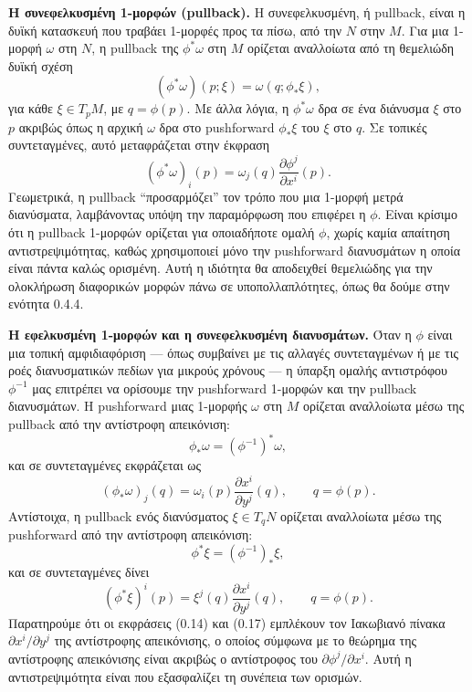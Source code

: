 \documentclass[12pt]{article}
\begin{document}
\textbf{Η συνεφελκυσμένη 1-μορφών (pullback).} Η συνεφελκυσμένη, ή pullback, είναι η δυϊκή κατασκευή που τραβάει 1-μορφές προς τα πίσω, από την $N$ στην $M$. Για μια 1-μορφή $\omega$ στη $N$, η pullback της $\phi^* \omega$ στη $M$ ορίζεται αναλλοίωτα από τη θεμελιώδη δυϊκή σχέση
\[
(\phi^* \omega)(p; \xi) = \omega(q; \phi_* \xi),
\]
για κάθε $\xi \in T_pM$, με $q = \phi(p)$. Με άλλα λόγια, η $\phi^* \omega$ δρα σε ένα διάνυσμα $\xi$ στο $p$ ακριβώς όπως η αρχική $\omega$ δρα στο pushforward $\phi_* \xi$ του $\xi$ στο $q$. Σε τοπικές συντεταγμένες, αυτό μεταφράζεται στην έκφραση
\[
(\phi^* \omega)_i(p) = \omega_j(q) \frac{\partial \phi^j}{\partial x^i}(p). \tag{0.16}
\]
Γεωμετρικά, η pullback ``προσαρμόζει'' τον τρόπο που μια 1-μορφή μετρά διανύσματα, λαμβάνοντας υπόψη την παραμόρφωση που επιφέρει η $\phi$. Είναι κρίσιμο ότι η pullback 1-μορφών ορίζεται για οποιαδήποτε ομαλή $\phi$, χωρίς καμία απαίτηση αντιστρεψιμότητας, καθώς χρησιμοποιεί μόνο την pushforward διανυσμάτων η οποία είναι πάντα καλώς ορισμένη. Αυτή η ιδιότητα θα αποδειχθεί θεμελιώδης για την ολοκλήρωση διαφορικών μορφών πάνω σε υποπολλαπλότητες, όπως θα δούμε στην ενότητα 0.4.4.

\textbf{Η εφελκυσμένη 1-μορφών και η συνεφελκυσμένη διανυσμάτων.} Όταν η $\phi$ είναι μια τοπική αμφιδιαφόριση --- όπως συμβαίνει με τις αλλαγές συντεταγμένων ή με τις ροές διανυσματικών πεδίων για μικρούς χρόνους --- η ύπαρξη ομαλής αντιστρόφου $\phi^{-1}$ μας επιτρέπει να ορίσουμε την pushforward 1-μορφών και την pullback διανυσμάτων. Η pushforward μιας 1-μορφής $\omega$ στη $M$ ορίζεται αναλλοίωτα μέσω της pullback από την αντίστροφη απεικόνιση:
\[
\phi_* \omega = (\phi^{-1})^* \omega,
\]
και σε συντεταγμένες εκφράζεται ως
\[
(\phi_* \omega)_j(q) = \omega_i(p) \frac{\partial x^i}{\partial y^j}(q), \qquad q = \phi(p). \tag{0.14}
\]
Αντίστοιχα, η pullback ενός διανύσματος $\xi \in T_qN$ ορίζεται αναλλοίωτα μέσω της pushforward από την αντίστροφη απεικόνιση:
\[
\phi^* \xi = (\phi^{-1})_* \xi,
\]
και σε συντεταγμένες δίνει
\[
(\phi^* \xi)^i(p) = \xi^j(q) \frac{\partial x^i}{\partial y^j}(q), \qquad q = \phi(p). \tag{0.17}
\]
Παρατηρούμε ότι οι εκφράσεις (0.14) και (0.17) εμπλέκουν τον Ιακωβιανό πίνακα $\partial x^i / \partial y^j$ της αντίστροφης απεικόνισης, ο οποίος σύμφωνα με το θεώρημα της αντίστροφης απεικόνισης είναι ακριβώς ο αντίστροφος του $\partial \phi^j / \partial x^i$. Αυτή η αντιστρεψιμότητα είναι που εξασφαλίζει τη συνέπεια των ορισμών.
\end{document}
